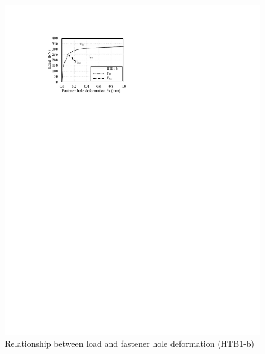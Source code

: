 \begin{figure}
\begin{minipage}[t]{0.48\textwidth}
    \includegraphics{imgs/ch4/lfhd-ch4.pdf}
    \caption{Relationship between load and fastener hole deformation (HTB1-b)}
    \label{fig-lfhd-ch4}
    \end{minipage}
    \begin{minipage}[t]{0.48\textwidth}

\end{minipage}
\end{figure}
